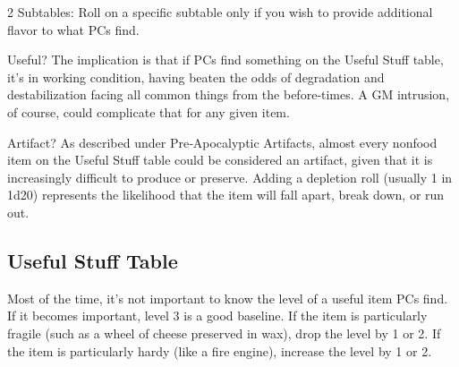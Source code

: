 \begin{multicols}{2}
Subtables: Roll on a specific subtable only if you wish to provide additional flavor to what PCs find. 

Useful? The implication is that if PCs find something on the Useful Stuff table, it’s in working condition, having beaten the odds of degradation and destabilization facing all common things from the before‑times. A GM intrusion, of course, could complicate that for any given item. 

Artifact? As described under Pre‑Apocalyptic Artifacts, almost every nonfood item on the Useful Stuff table could be considered an artifact, given that it is increasingly difficult to produce or preserve. Adding a depletion roll (usually 1 in 1d20) represents the likelihood that the item will fall apart, break down, or run out.

\subsection{Useful Stuff Table}

Most of the time, it’s not important to know the level of a useful item PCs find. If it becomes important, level 3 is a good baseline. If the item is particularly fragile (such as a wheel of cheese preserved in wax), drop the level by 1 or 2. If the item is particularly hardy (like a fire engine), increase the level by 1 or 2.

\end{multicols}

